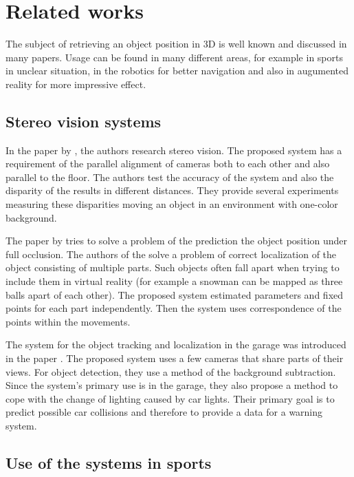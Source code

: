 \chapter{Related works} 

The subject of retrieving an object position in 3D is well known and discussed
in many papers. Usage can be found in many different areas, for example in
sports in unclear situation, in the robotics for better navigation and
also in augumented reality for more impressive effect.


\section{Stereo vision systems}

In the paper by \citet*{zheng2010study}, the authors research stereo vision. The
proposed system has a requirement of the parallel alignment of cameras both to
each other and also parallel to the floor. The authors test the accuracy of the
system and also the disparity of the results in different distances. They
provide several experiments measuring these disparities moving an object in an
environment with one-color background.

The paper by \citet*{black2002multi} tries to solve a problem of the prediction
the object position under full occlusion. The authors of the
\citet*{yonemoto1998tracking} solve a problem of correct localization of the
object consisting of multiple parts. Such objects often fall apart when
trying to include them in virtual reality (for example a snowman can be mapped
as three balls apart of each other). The proposed system estimated parameters and
fixed points for each part independently. Then the system uses correspondence
of the points within the movements.

The system for the object tracking and localization in the garage was introduced
in the paper \citet*{ibisch2015arbitrary}. The proposed system uses a few cameras
that share parts of their views. For object detection, they use a method of the
background subtraction. Since the system's primary use is in the garage, they
also propose a method to cope with the change of lighting caused by car
lights. Their primary goal is to predict possible car collisions and therefore
to provide a data for a warning system.

\section{Use of the systems in sports}

